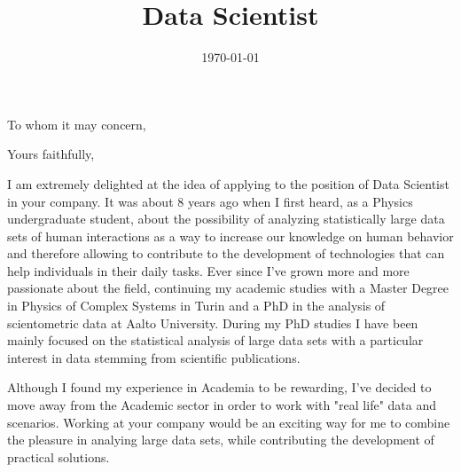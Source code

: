 \documentclass[11pt,a4paper,sans]{moderncv}        %
\title{Data Scientist}                               %
\begin{document}
\date{\today}
\opening{To whom it may concern,}
\closing{Yours faithfully,}
\makelettertitle

	
I am extremely delighted at the idea of applying to the position of Data Scientist in your company. It was about 8 years 
ago when I first heard, as a Physics undergraduate student, about the possibility of analyzing statistically 
large data sets of human interactions as a way to increase our knowledge on human behavior and therefore allowing 
to contribute to the development of technologies that can help individuals in their daily tasks. Ever since I've grown 
more and more passionate about the field, continuing my academic studies with a Master Degree in Physics of Complex Systems in Turin and  
a PhD in the analysis of scientometric data at Aalto University. During my PhD studies I have been mainly
focused on the statistical analysis of large data sets
with a particular interest in data stemming from scientific publications.


Although I found my experience in Academia to be rewarding, I've decided to move away from the Academic sector in order to work with "real life" data and scenarios. 
Working at your company would be an exciting way for me to combine the pleasure in analying large data sets, while contributing the development of practical solutions.


\makeletterclosing
\end{document}
